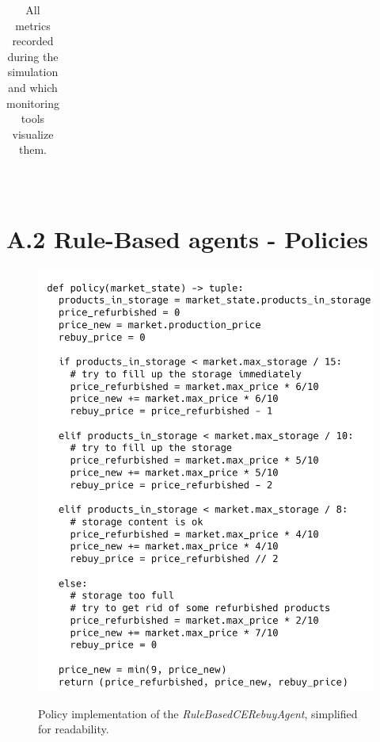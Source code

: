 \begin{table}[!]
\begin{tabular}{|cr|p{2.2mm}|p{2.2mm}|p{2.2mm}|p{2.2mm}|p{2.2mm}|p{2.2mm}|p{2.2mm}|p{2.2mm}|p{2.2mm}|p{2.2mm}|p{2.2mm}|p{2.2mm}|p{2.2mm}|p{2.2mm}|p{2.2mm}|p{2.2mm}|}
	\end{tabular}\\
	\caption{All metrics recorded during the simulation and which monitoring tools visualize them.}\label{tab:AllMetrics}
\end{table}

\newpage
\section*{A.2 Rule-Based agents - Policies}

\begin{figure}[ht]
	\includegraphics[width = \textwidth]{images/policies/RuleBasedCERebuyAgentPolicy.png}\\
	\caption{Policy implementation of the \emph{RuleBasedCERebuyAgent}, simplified for readability.}\label{fig:PolicyRuleBasedCERebuy}
\end{figure}

